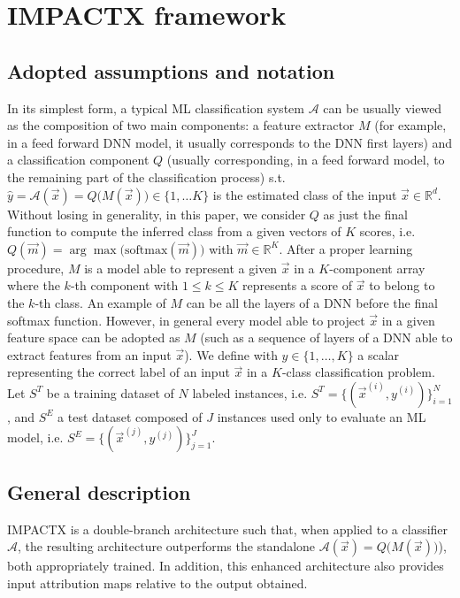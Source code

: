 \section{IMPACTX framework}
\label{sec:method}
\subsection{Adopted assumptions and notation}
In its simplest form, a typical ML classification system $\mathcal{A}$ can be usually viewed as the composition of two main components: a feature extractor $M$ (for example, in a feed forward DNN model, it usually corresponds to the DNN first layers) and a classification component $Q$ (usually corresponding, in a feed forward model, to the remaining part of the classification process) s.t. $\hat{y}=\mathcal{A}(\vec{x})=Q\big(M(\vec{x})\big) \in \{1,\dots K\}$ is the estimated class of the input $\vec{x}\in \mathbb{R}^d$. Without losing in generality, in this paper, we consider $Q$ as just the final function to compute the inferred class from a given vectors of $K$ scores, i.e. $Q(\vec{m})=\arg\max\big(\text{softmax}(\vec{m})\big)$ with $\vec{m}\in \mathbb{R}^K$. After a proper learning procedure, $M$ is a model able to represent a given $\vec{x}$ in a $K$-component array where the $k$-th component with $1\leq k \leq K$ represents a score of $\vec{x}$ to belong to the $k$-th class. An example of $M$ can be all the layers of a DNN before the final softmax function. However, in general every model able to project $\vec{x}$ in a given feature space can be adopted as $M$ (such as a sequence of layers of a DNN able to extract features from an input $\vec{x}$).
We define with $y \in \{1,\dots,K\}$ a scalar representing the correct label of an input $\vec{x}$  in a $K$-class classification problem. Let $S^T$ be a training dataset of $N$ labeled instances, i.e. $S^T = \{(\vec{x}^{(i)}, y^{(i)})\}_{i=1}^N$, and $S^E$ a test dataset composed of $J$ instances used only to evaluate an ML model, i.e. $S^E =\{ (\vec{x}^{(j)}, y^{(j)}) \}_{j=1}^J$. %


\subsection{General description}
IMPACTX is a double-branch architecture such that, when applied to a classifier $\mathcal{A}$, the resulting architecture outperforms the standalone $\mathcal{A}(\vec{x})=Q\big(M(\vec{x})\big)$), both appropriately trained. In addition, this enhanced architecture  also provides input attribution maps relative to the output obtained.

